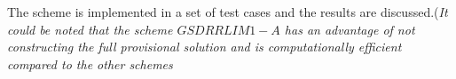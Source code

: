 \documentclass[a4paper,16pt]{article}
\begin{document}
The scheme is implemented in a set of test cases and the results are discussed.(\textit{It could be noted that the scheme $GSDRRLIM1-A$ has an advantage of not constructing the full provisional solution and is computationally efficient compared to the other schemes}







\end{document}
